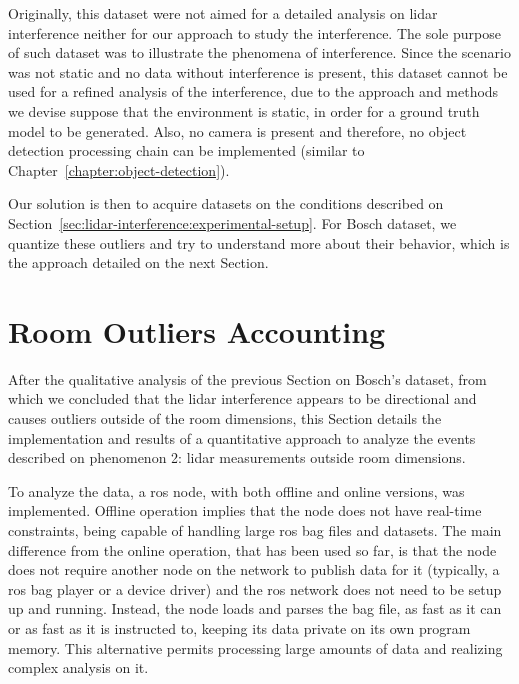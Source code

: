Originally, this dataset were not aimed for a detailed analysis on \ac{lidar} interference neither for our approach to study the interference. The sole purpose of such dataset was to illustrate the phenomena of interference. Since the scenario was not static and no data without interference is present, this dataset cannot be used for a refined analysis of the interference, due to the approach and methods we devise suppose that the environment is static, in order for a ground truth model to be generated. Also, no camera is present and therefore, no object detection processing chain can be implemented (similar to Chapter~\ref{chapter:object-detection}). 

Our solution is then to acquire datasets on the conditions described on Section~\ref{sec:lidar-interference:experimental-setup}. For Bosch dataset, we quantize these outliers and try to understand more about their behavior, which is the approach detailed on the next Section.




\section{Room Outliers Accounting}
\label{sec:lidar-interference:room-outliers}
After the qualitative analysis of the previous Section on Bosch's dataset, from which we concluded that the \ac{lidar} interference appears to be directional and causes outliers outside of the room dimensions, this Section details the implementation and results of a quantitative approach to analyze the events described on phenomenon 2: \ac{lidar} measurements outside room dimensions.

To analyze the data, a \ac{ros} node, with both offline and online versions, was implemented. Offline operation implies that the node does not have real-time constraints, being capable of handling large \ac{ros} bag files and datasets. The main difference from the online operation, that has been used so far, is that the node does not require another node on the network to publish data for it (typically, a \ac{ros} bag player or a device driver) and the \ac{ros} network does not need to be setup up and running. Instead, the node loads and parses the bag file, as fast as it can or as fast as it is instructed to, keeping its data private on its own program memory. This alternative permits processing large amounts of data and realizing complex analysis on it.

